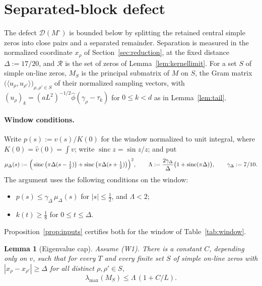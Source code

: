 \documentclass[11pt]{article}
\newtheorem{lemma}[theorem]{Lemma}
\theoremstyle{definition}
\newcommand{\cR}{\mathcal{R}}
\begin{document}
\section{Separated-block defect}\label{sec:separated}

The defect $\mathcal D(M^\circ)$ is bounded below by splitting the retained
central simple zeros into close pairs and a separated remainder. Separation is
measured in the normalized coordinate $x_\rho$ of Section~\ref{sec:reduction},
at the fixed distance $\Delta:=17/20$, and $\cR$ is the set of zeros of
Lemma~\ref{lem:kernellimit}. For a set $S$ of simple on-line zeros, $M_S$ is
the principal submatrix of $M$ on $S$, the Gram matrix
$\big(\langle u_\rho,u_{\rho'}\rangle\big)_{\rho,\rho'\in S}$ of their
normalized sampling vectors, with
$(u_\rho)_k=(aL^2)^{-1/2}\widehat\phi(\gamma_\rho-\tau_k)$ for $0\le k<d$ as
in Lemma~\ref{lem:tail}.

\paragraph{Window conditions.}
Write $p(s):=v(s)/K(0)$ for the window normalized to unit integral, where
$K(0)=\widehat v(0)=\int v$; write $\operatorname{sinc}z=\sin z/z$; and put
\[
  \mu_\Delta(s):=\Big(\operatorname{sinc}\big(\pi\Delta(s-\tfrac12)\big)
     +\operatorname{sinc}\big(\pi\Delta(s+\tfrac12)\big)\Big)^2,\qquad
  \Lambda:=\frac{2\gamma_\Delta}{\Delta}\big(1+\operatorname{sinc}(\pi\Delta)\big),
  \qquad \gamma_\Delta:=7/10 .
\]
The argument uses the following conditions on the window:
\begin{itemize}
\item[(W1)] $p(s)\le\gamma_\Delta\,\mu_\Delta(s)$ for $|s|\le\tfrac12$, and
$\Lambda<2$;
\item[(W2)] $k(t)\ge\tfrac18$ for $0\le t\le\Delta$.
\end{itemize}
Proposition~\ref{prop:inputs} certifies both for the window of
Table~\ref{tab:window}.

\begin{lemma}[Eigenvalue cap]\label{lem:cap}
Assume (W1). There is a constant $C$, depending only on $v$, such that for
every $T$ and every finite set $S$ of simple on-line zeros with
$|x_\rho-x_{\rho'}|\ge\Delta$ for all distinct $\rho,\rho'\in S$,
\[
  \lambda_{\max}(M_S)\le\Lambda\,(1+C/L).
\]
\end{lemma}
\end{document}
